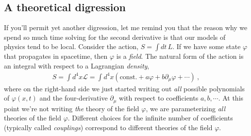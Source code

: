 \subsection{A theoretical digression}
\label{sec:EFT:philosophy}

If you'll permit yet another digression, let me remind you that the reason why we spend so much time solving for the second derivative is that our models of physics tend to be local. Consider the action, $S = \int dt \, L$. If we have some state $\varphi$ that propagates in spacetime, then $\varphi$ is a \emph{field}. The natural form of the action is an integral with respect to a Lagrangian \emph{density},
\begin{align}
	S = \int d^4x \mathcal L = \int d^4x \left(\text{const.} + a \varphi + b \partial_\mu \varphi + \cdots\right) \ ,
\end{align}
where on the right-hand side we just started writing out \emph{all} possible polynomials of $\varphi(x,t)$ and the four-derivative $\partial_\mu$ with respect to coefficients $a, b,\cdots$. At this point we're not writing \emph{the} theory of the field $\varphi$, we are parameterizing \emph{all} theories of the field $\varphi$. Different choices for the infinite number of coefficients (typically called \emph{couplings}) correspond to different theories of the field $\varphi$.

